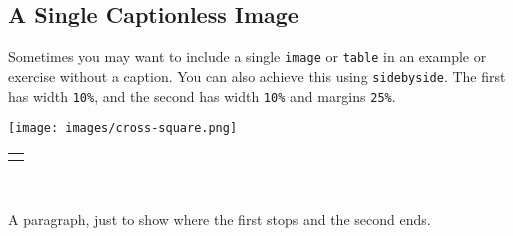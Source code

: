 \documentclass[10pt,]{article}
\theoremstyle{plain}
\theoremstyle{definition}
\theoremstyle{definition}
\theoremstyle{definition}
\theoremstyle{definition}
\theoremstyle{definition}
\theoremstyle{definition}
\numberwithin{equation}{section}
\newlength{\panelmax}
\begin{document}
\subsection[{A Single Captionless Image}]{A Single Captionless Image}\label{subsection-39}
\hypertarget{p-658}{}%
Sometimes you may want to include a single \lstinline?image? or \lstinline?table? in an example or exercise without a caption. You can also achieve this using \lstinline?sidebyside?. The first has width \lstinline?10%?, and the second has width \lstinline?10%? and margins \lstinline?25%?.%
{%
\setlength{\panelmax}{0pt}
\ifdefined\panelboxAimage\else\newsavebox{\panelboxAimage}\fi%
\begin{lrbox}{\panelboxAimage}
\texttt{[image: images/cross-square.png]}
\end{lrbox}
\ifdefined\phAimage\else\newlength{\phAimage}\fi%
\setlength{\phAimage}{\ht\panelboxAimage+\dp\panelboxAimage}
\settototalheight{\phAimage}{\usebox{\panelboxAimage}}
\setlength{\panelmax}{\maxof{\panelmax}{\phAimage}}
\leavevmode%
\setlength{\tabcolsep}{0\linewidth}
\par\medskip\noindent
\hspace*{0.45\linewidth}%
\begin{tabular}{@{}*{1}{c}@{}}
\begin{minipage}[c][\panelmax][t]{0.1\linewidth}\usebox{\panelboxAimage}\end{minipage}\end{tabular}\\
}%
\par
\hypertarget{p-659}{}%
A paragraph, just to show where the first stops and the second ends.%
\end{document}
